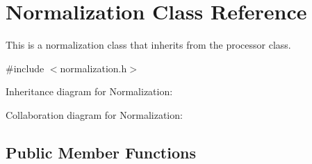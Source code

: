 \hypertarget{classNormalization}{}\section{Normalization Class Reference}
\label{classNormalization}


This is a normalization class that inherits from the processor class.  




{\ttfamily \#include $<$normalization.\+h$>$}



Inheritance diagram for Normalization\+:


Collaboration diagram for Normalization\+:
\subsection*{Public Member Functions}
